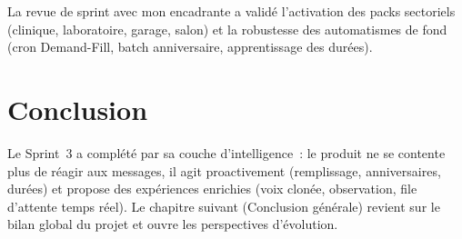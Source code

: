 La revue de sprint avec mon encadrante a validé l'activation des
packs sectoriels (clinique, laboratoire, garage, salon) et la
robustesse des automatismes de fond (cron Demand-Fill, batch
anniversaire, apprentissage des durées).

\section{Conclusion}
Le Sprint~3 a complété \nova{} par sa couche d'intelligence~: le
produit ne se contente plus de réagir aux messages, il agit
proactivement (remplissage, anniversaires, durées) et propose des
expériences enrichies (voix clonée, observation, file d'attente
temps réel). Le chapitre suivant (Conclusion générale) revient sur
le bilan global du projet et ouvre les perspectives d'évolution.
